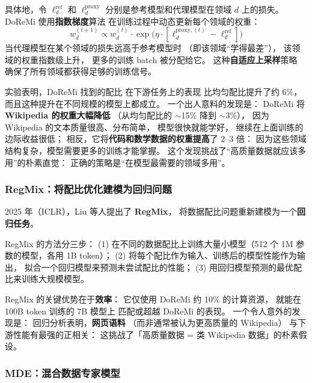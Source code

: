 具体地，令 $\ell_d^{\text{ref}}$ 和 $\ell_d^{\text{proxy}}$
分别是参考模型和代理模型在领域 $d$ 上的损失。
DoReMi 使用\textbf{指数梯度}算法
在训练过程中动态更新每个领域的权重：
\begin{equation}
  w_d^{(t+1)} \propto w_d^{(t)} \cdot
  \exp\!\bigl(\eta \cdot [\ell_d^{\text{proxy},(t)} - \ell_d^{\text{ref}}]\bigr)
\end{equation}
当代理模型在某个领域的损失远高于参考模型时
（即该领域“学得最差”），
该领域的权重指数级上升，
更多的训练 batch 被分配给它。
这种\textbf{自适应上采样}策略
确保了所有领域都获得足够的训练信号。

实验表明，DoReMi 找到的配比
在下游任务上的表现
比均匀配比提升了约 6\%，
而且这种提升在不同规模的模型上都成立。
一个出人意料的发现是：
DoReMi 将 \textbf{Wikipedia 的权重大幅降低}
（从均匀配比的 $\sim$15\% 降到 $\sim$3\%），
因为 Wikipedia 的文本质量很高、分布简单，
模型很快就能学好，
继续在上面训练的边际收益很低；
相反，它将\textbf{代码和数学数据的权重提高}了 2--3 倍：
因为这些领域结构复杂，模型需要更多的训练才能掌握。
这个发现挑战了“高质量数据就应该多用”的朴素直觉：
正确的策略是“在模型最需要的领域多用”。

\subsubsection{RegMix：将配比优化建模为回归问题}

2025 年（ICLR），Liu 等人提出了 \textbf{RegMix}，
将数据配比问题重新建模为一个\textbf{回归任务}。

RegMix 的方法分三步：
(1) 在不同的数据配比上训练大量小模型（512 个 1M 参数的模型，各用 1B token）；
(2) 将每个配比作为输入、训练后的模型性能作为输出，
拟合一个回归模型来预测未尝试配比的性能；
(3) 用回归模型预测的最优配比来训练大规模模型。

RegMix 的关键优势在于\textbf{效率}：
它仅使用 DoReMi 约 10\% 的计算资源，
就能在 100B token 训练的 7B 模型上
匹配或超越 DoReMi 的表现。
一个令人意外的发现是：
回归分析表明，\textbf{网页语料}
（而非通常被认为更高质量的 Wikipedia）
与下游性能有最强的正相关：
这挑战了「高质量数据 = 类 Wikipedia 数据」的朴素假设。

\subsubsection{MDE：混合数据专家模型}

